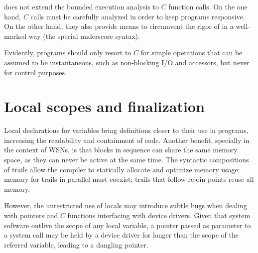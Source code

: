 \CEU does not extend the bounded execution analysis to $C$ function calls. 
On the one hand, $C$ calls must be carefully analyzed in order to keep programs 
responsive.
On the other hand, they also provide means to circumvent the rigor of \CEU in a 
well-marked way (the special underscore syntax).
%

%
Evidently, programs should only resort to $C$ for simple operations that can be 
assumed to be instantaneous, such as non-blocking I/O and  
accessors, but never for control purposes.

\section{Local scopes and finalization}
\label{sec.ceu.fins}

Local declarations for variables bring definitions closer to their use in 
programs, increasing the readability and containment of code.
Another benefit, specially in the context of WSNs, is that blocks in sequence 
can share the same memory space, as they can never be active at the same time.
%
The syntactic compositions of trails allow the \CEU compiler to statically 
allocate and optimize memory usage:
memory for trails in parallel must coexist;
trails that follow rejoin points reuse all memory.

However, the unrestricted use of locals may introduce subtle bugs when dealing 
with pointers and $C$ functions interfacing with device drivers.
Given that system software outlive the scope of any local variable, a pointer 
passed as parameter to a system call may be held by a device driver
for longer than the scope of the referred variable, leading to a dangling 
pointer.

